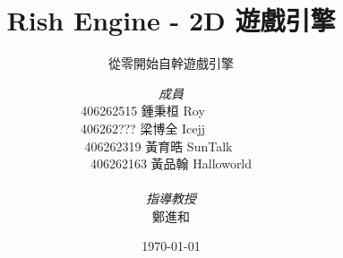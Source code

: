 \documentclass[a4paper, 12pt]{report}
\institute{輔仁大學資訊工程學系}
\title{Rish Engine - 2D 遊戲引擎}
\subtitle{從零開始自幹遊戲引擎}
\author{\textit{成員} \\
	406262515 \textsc{鍾秉桓} Roy\ \ \ \ \ \ \ \ \  \\
    406262??? \textsc{梁博全} Icejj\ \ \ \ \ \ \ \ \  \\
    406262319 \textsc{黃育晧} SunTalk\ \ \ \  \\
    406262163 \textsc{黃品翰} Halloworld \\
    \ \\
    \textit{指導教授} \\
    鄭進和
}
\date{\today}
\begin{document}
    \maketitle
    \romantableofcontents

    
    
    

\end{document}
